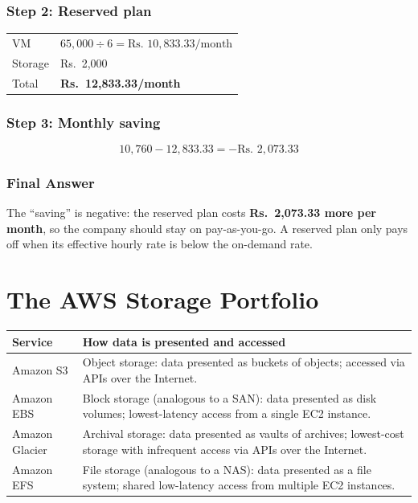 \documentclass[11pt,a4paper]{article}
\begin{document}
\subsubsection*{Step 2: Reserved plan}

\begin{tabularx}{\textwidth}{@{}lX@{}}
VM & $65{,}000 \div 6 = \text{Rs. } 10{,}833.33/\text{month}$ \\
Storage & Rs.\ 2,000 \\
Total & \textbf{Rs.\ 12,833.33/month} \\
\end{tabularx}

\subsubsection*{Step 3: Monthly saving}

\[
10{,}760 - 12{,}833.33 = -\text{Rs. } 2{,}073.33
\]

\subsubsection*{Final Answer}

The ``saving'' is negative: the reserved plan costs \textbf{Rs.\ 2,073.33 more per month}, so
the company should stay on pay-as-you-go. A reserved plan only pays off when its effective
hourly rate is below the on-demand rate.

\newpage
{}

\section{The AWS Storage Portfolio}



\begin{tabularx}{\textwidth}{@{}lX@{}}
\toprule
\rowcolor{tablehead}\textbf{Service} & \textbf{How data is presented and accessed} \\
\midrule
Amazon S3 & Object storage: data presented as buckets of objects; accessed via APIs over the
  Internet. \\
\addlinespace
Amazon EBS & Block storage (analogous to a SAN): data presented as disk volumes;
  lowest-latency access from a single EC2 instance. \\
\addlinespace
Amazon Glacier & Archival storage: data presented as vaults of archives; lowest-cost storage
  with infrequent access via APIs over the Internet. \\
\addlinespace
Amazon EFS & File storage (analogous to a NAS): data presented as a file system; shared
  low-latency access from multiple EC2 instances. \\
\bottomrule
\end{tabularx}
\end{document}
